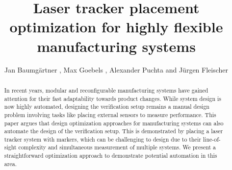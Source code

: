 \documentclass{svproc}
\begin{document}
\mainmatter              %
\title{
Laser tracker placement optimization for highly flexible manufacturing systems
}


\newcommand*\samethanks[1][\value{footnote}]{\footnotemark[#1]}
\makeatletter
\renewcommand*{\@fnsymbol}[1]{\ifcase#1\or\@arabic{#1}\else*\fi}
\makeatother

\author{Jan Baumgärtner ,
Max Goebels ,   Alexander Puchta  and Jürgen Fleischer%
}
%

%
%

\maketitle

\begin{abstract}
In recent years, modular and reconfigurable manufacturing systems have gained attention for their fast adaptability towards product changes.
While system design is now highly automated, designing the verification setup remains a manual design problem involving tasks like placing external sensors to measure performance.
This paper argues that design optimization approaches for manufacturing systems can also automate the design of the verification setup.
This is demonstrated by placing a laser tracker system with markers, which can be challenging to design due to their line-of-sight complexity and simultaneous measurement of multiple systems.
We present a straightforward optimization approach to demonstrate potential automation in this area.
\end{abstract}
\end{document}
